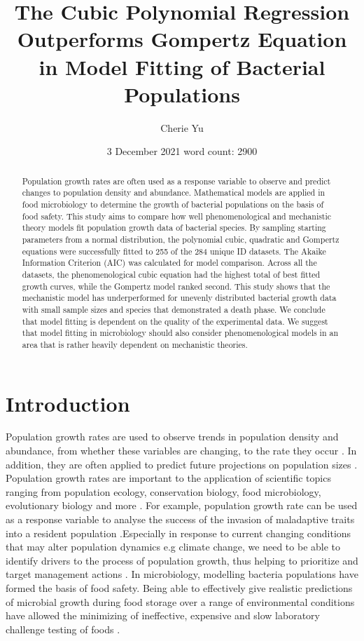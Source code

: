 \documentclass[11pt]{article}
\title{The Cubic Polynomial Regression Outperforms Gompertz Equation in Model Fitting of Bacterial Populations}
\author{Cherie Yu}
\affil{Imperial College London}
\date{3 December 2021\hspace*{3cm} word count: 2900}
\begin{document}
\maketitle

\pagebreak
\begin{abstract}
    Population growth rates are often used as a response variable to observe and predict changes to 
    population density and abundance. Mathematical models are applied in food microbiology to 
    determine the growth of bacterial populations on the basis of food safety. This study aims 
    to compare how well phenomenological and mechanistic theory models fit population growth data 
    of bacterial species. By sampling starting parameters from a normal distribution, the polynomial 
    cubic, quadratic and Gompertz equations were successfully fitted to 255 of the 284 unique ID datasets. 
    The Akaike Information Criterion (AIC) was calculated for model comparison. Across all the datasets, 
    the phenomenological cubic equation had the highest total of best fitted growth curves, while 
    the Gompertz model ranked second. This study shows that the mechanistic model has underperformed 
    for unevenly distributed bacterial growth data with small sample sizes and species that demonstrated 
    a death phase. We conclude that model fitting is dependent on the quality of the 
    experimental data. We suggest that model fitting in microbiology should also consider
    phenomenological models in an area that is rather heavily dependent on mechanistic theories. 
\end{abstract}

\section{Introduction}

\linenumbers
Population growth rates are used to observe trends in population density and abundance, from 
whether these variables are changing, to the rate they occur \cite{sibly_population_2002}. In addition, they are often applied to predict future projections on population sizes \cite{sibly_population_2002}. Population 
growth rates are important to the application of scientific topics ranging from population ecology, 
conservation biology, food microbiology, evolutionary biology and more \cite{sibly_population_2002,sibly_population_2002-1}. For example, 
population growth rate can be used as a response variable to analyse the success of the invasion 
of maladaptive traits into a resident population \cite{sibly_population_2002-1}.Especially in response to current changing 
conditions that may alter population dynamics e.g climate change, we need to be able to identify 
drivers to the process of population growth, thus helping to prioritize and target management actions \cite{eacker_assessing_2017}. 
In microbiology, modelling bacteria populations have formed the basis of food safety. Being able 
to effectively give realistic predictions of microbial growth during food storage over a range of 
environmental conditions have allowed the minimizing of ineffective, expensive and slow laboratory 
challenge testing of foods \cite{soboleva_predictive_2000,baranyi_mathematics_1995,perni_estimating_2005}. 
\end{document}
